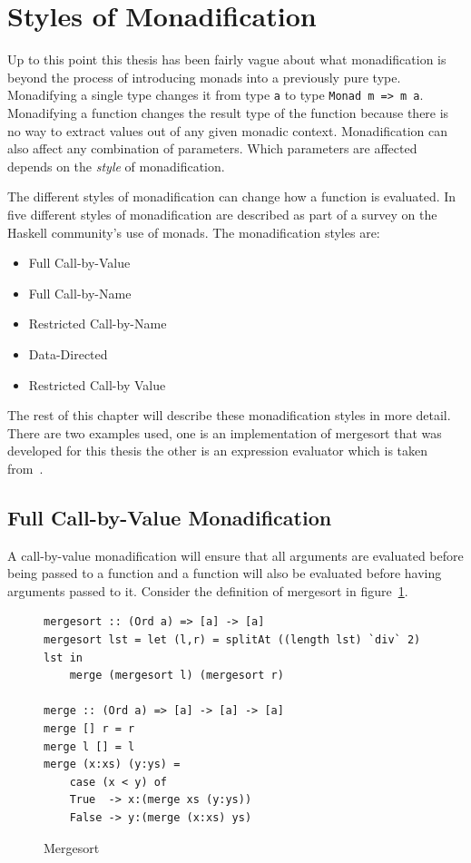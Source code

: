 \section{Styles of Monadification}
\label{monadStyles}

Up to this point this thesis has been fairly vague about what monadification is beyond the process of introducing monads into a previously pure type. Monadifying a single type changes it from type \texttt{a} to type \texttt{Monad m => m a}. Monadifying a function changes the result type of the function because there is no way to extract values out of any given monadic context. Monadification can also affect any combination of parameters. Which parameters are affected depends on the \textit{style} of monadification.

The different styles of monadification can change how a function is evaluated. In~\citep{monadSurvey} five different styles of monadification are described as part of a survey on the Haskell community's use of monads. The monadification styles are:

\begin{itemize}
\item Full Call-by-Value
\item Full Call-by-Name
\item Restricted Call-by-Name
\item Data-Directed
\item Restricted Call-by Value
\end{itemize}

The rest of this chapter will describe these monadification styles in more detail. There are two examples used, one is an implementation of mergesort that was developed for this thesis the other is an expression evaluator which is taken from~\citep{monadSurvey}. 

\subsection{Full Call-by-Value Monadification}

A call-by-value monadification will ensure that all arguments are evaluated before being passed to a function and a function will also be evaluated before having arguments passed to it. Consider the definition of mergesort in figure~\ref{mergesrt}.

\begin{figure}[t]
\begin{lstlisting}
mergesort :: (Ord a) => [a] -> [a]
mergesort lst = let (l,r) = splitAt ((length lst) `div` 2) lst in
	merge (mergesort l) (mergesort r)
	
merge :: (Ord a) => [a] -> [a] -> [a]
merge [] r = r
merge l [] = l
merge (x:xs) (y:ys) = 
	case (x < y) of
	True  -> x:(merge xs (y:ys))
	False -> y:(merge (x:xs) ys)						
\end{lstlisting}
\caption{Mergesort}
\label{mergesrt}
\end{figure}

